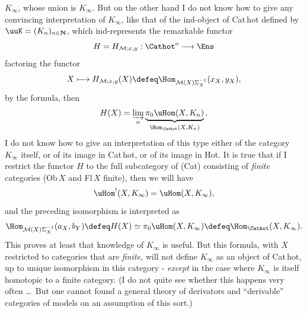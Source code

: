 $K_\infty$, whose union is $K_\infty$. But on the other hand I do not know how to give any convincing interpretation of $K_\infty$, like that of the ind-object of Cat\,hot defined by $\uuK = (K_n)_{n\in\mathbf{N}}$, which ind-represents the remarkable functor %
\[
H = H_{\mathcal{M};x,y} : \Cathot^{o} \longrightarrow \Ens
\]
factoring the functor
\[
X \longmapsto H_{\mathcal{M};x,y}(X) \defeq \Hom_{\mathcal{M}(X)\Sigma_X^{-1}}(x_X, y_X),
\]
by the formula, then
\[
H(X) = \varinjlim_{n} \underbrace{\pi_0\uHom(X, K_n)}_{\Hom_{\Cathot}(X,K_n)} .
\]
I do not know how to give an interpretation of this type either of the category $K_\infty$ itself, or of its image in Cat\,hot, or of its image in Hot. It is true that if I restrict the functor $H$ to the full subcategory of (Cat) consisting of \textit{finite} categories (Ob\,$X$ and Fl\,$X$ finite), then we will have
\[
\uHom^{!}(X, K_\infty) = \uHom(X, K_\infty),
\]
and the preceding isomorphism is interpreted as %
\[
\Hom_{\mathcal{M}(X)\Sigma_X^{-1}}(a_X, b_Y) \defeq H(X) \simeq \pi_0\uHom(X, K_\infty) \defeq \Hom_{\Cathot}(X, K_\infty).
\]
 This proves at least that knowledge of $K_\infty$ is useful. But this formula, with $X$ restricted to categories that are \textit{finite,} will not define $K_\infty$ as an object of Cat\,hot, up to unique isomorphism in this category - \textit{except} in the case where $K_\infty$ is itself homotopic to a
finite category. (I do not quite see whether this happens very often \ldots\ But one cannot found a general theory of derivators and ``derivable'' categories of models on an assumption of this sort.)

